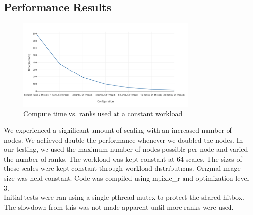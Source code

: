 \documentclass[10pt, journal]{vgtc}                %
\newcommand\tab[1][1cm]{\hspace*{#1}}
\begin{document}
\subsection{Performance Results}
\begin{flushleft}
	\begin{figure}[h!]
		\centering
		\includegraphics[width=3.5in]{scaling_performance.png}
		\caption{Compute time vs. ranks used at a constant workload}
	\end{figure}
\tab We experienced a significant amount of scaling with an increased number of nodes. We achieved double the performance whenever we doubled the nodes. In our testing, we used the maximum number of nodes possible per node and varied the number of ranks. The workload was kept constant at 64 scales. The sizes of these scales were kept constant through workload distributions. Original image size was held constant. Code was compiled using mpixlc\_r and optimization level 3.\\\smallskip
\tab Initial tests were ran using a single pthread mutex to protect the shared hitbox. The slowdown from this was not made apparent until more ranks were used. 


\end{flushleft}
\end{document}
